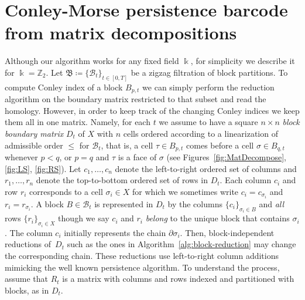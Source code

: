 \documentclass[letterpaper,11pt]{article}
\theoremstyle{plain}
\theoremstyle{definition}
\def\cB{\text{$\mathcal B$}}
\newcounter{li}
\newcommand{\BD}{\cB}
\newcommand{\zzBD}{\mathfrak{B}}
\begin{document}
\section{Conley-Morse persistence barcode from matrix decompositions}\label{sec:matrix-decomposition}
Although our algorithm works for any fixed field $\Bbbk$, 
    for simplicity we describe it for $\Bbbk=\mathbb{Z}_2$.
Let $\zzBD\coloneqq\{\cB_t\}_{t\in[0,T]}$ be a zigzag filtration of block partitions.
To compute Conley index of a block $B_{p,t}$ we can simply perform the reduction algorithm on the boundary matrix restricted to that subset and read the homology.
However, in order to keep track of the changing Conley indices we keep them all in one matrix. 
Namely, for each $t$ we assume to have a square $n\times n$ \emph{block boundary matrix} $D_t$ of $X$ with $n$ cells ordered according to a linearization of admissible order $\leq$ for $\BD_t$, 
    that is, a cell $\tau\in B_{p,t}$ comes before a cell $\sigma\in B_{q,t}$ whenever $p<q$, or $p=q$ and $\tau$ is a face of $\sigma$ (see Figures~\ref{fig:MatDecompose}, \ref{fig:LS}, \ref{fig:RS}).
    Let $c_1,\ldots,c_n$ denote the left-to-right ordered set of columns and
    $r_1,\ldots, r_n$ denote the top-to-bottom ordered set of rows in $D_t$.
    Each column $c_i$ and row $r_i$ corresponds to a cell $\sigma_i\in X$ for which we sometimes write $c_i=c_{\sigma_i}$ and $r_i=r_{\sigma_i}$. 
    A block $B\in \BD_t$ is represented in $D_t$ by the columns 
    $\{c_i\}_{\sigma_i\in B}$ and \emph{all} rows $\{r_i\}_{\sigma_i\in X}$ though 
    we say $c_i$ and $r_i$ \emph{belong} to the unique block that contains $\sigma_i$. 
    The column $c_i$ initially represents the chain $\partial \sigma_i$.
Then, block-independent reductions of~$D_t$ such as the ones in Algorithm~\ref{alg:block-reduction} may change the corresponding chain.
These reductions use 
left-to-right column additions mimicking the well known persistence algorithm.
To understand the process, 
assume that $R_t$ is a matrix with columns and rows indexed and partitioned
with blocks, as in $D_t$.
\end{document}

